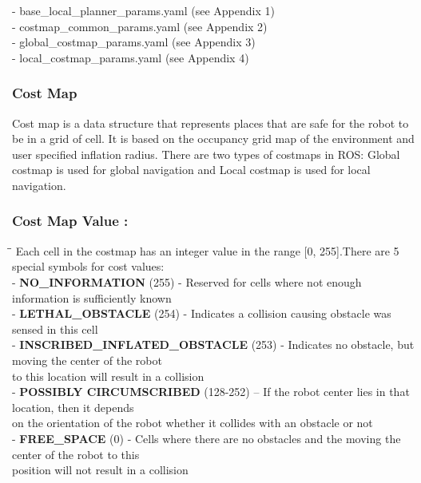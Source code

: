 \documentclass[10pt,a4paper]{article}
\begin{document}
\begin{tabbing}
- base\_local\_planner\_params.yaml (see Appendix 1) \\
- costmap\_common\_params.yaml (see Appendix 2) \\
- global\_costmap\_params.yaml (see Appendix 3) \\
- local\_costmap\_params.yaml (see Appendix 4) \\
\end{tabbing}



\subsubsection{Cost Map}

Cost map is a data structure that represents places that are safe for the robot to be in a grid of cell. It is based on the occupancy grid map of the environment and user specified inflation radius. There are two types of costmaps in ROS: Global costmap is used for global navigation and Local costmap is used for local navigation.

\subsubsection{Cost Map Value :}

\begin{tabbing}
\hspace{1cm}\=\hspace{1cm}\=\kill
Each cell in the costmap has an integer value in the range [0, 255].There are 5 special symbols for cost values:\\
\> - \textbf{NO\_INFORMATION} (255) - Reserved for cells where not enough information is sufficiently known\\
\> - \textbf{LETHAL\_OBSTACLE} (254) - Indicates a collision causing obstacle was sensed in this cell\\
\> - \textbf{INSCRIBED\_INFLATED\_OBSTACLE} (253) - Indicates no obstacle, but moving the center of the robot\\ to this location will result in a collision\\
\> - \textbf{POSSIBLY CIRCUMSCRIBED} (128-252) – If the robot center lies in that location, then it depends\\ on the orientation of the robot whether it collides with an obstacle or not \\
\> - \textbf{FREE\_SPACE} (0) - Cells where there are no obstacles and the moving the center of the robot to this\\ position will not result in a collision\\
\end{tabbing}
\end{document}
